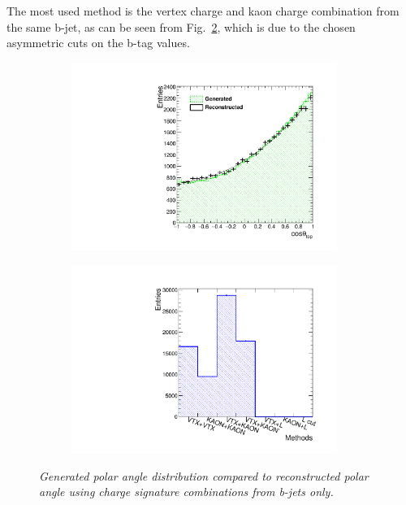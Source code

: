 The most used method is the vertex charge and kaon charge combination from the same b-jet, as can be seen from Fig.~\ref{fig:TopAsymmetryNoCutBjet_b_3}, which is due to the chosen asymmetric cuts on the b-tag values. 
\begin{figure}
	\centering
	\begin{subfigure}{0.5\textwidth}
		\includegraphics[width=0.95\textwidth]{ILD/plots/top-asymmetry-bonly-gcut.pdf}
		\caption{\label{fig:TopAsymmetryNoCutBjet_a_3} }
	\end{subfigure}%
	\begin{subfigure}{0.5\textwidth}
		\centering
		\includegraphics[width=0.95\textwidth]{ILD/plots/top-methods-bonly-gcut.pdf}
		\caption{\label{fig:TopAsymmetryNoCutBjet_b_3} }
	\end{subfigure}
	\caption{\sl Generated polar angle distribution compared to reconstructed polar angle using charge signature combinations from b-jets only. }
	\label{fig:TopAsymmetryNoCutBjet_3}
\end{figure}

